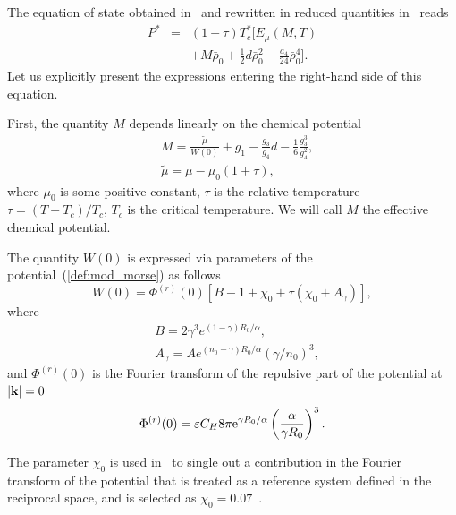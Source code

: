 The equation of state obtained in~\cite{KD20} and rewritten in reduced quantities in~\cite{DKRP24,DKRP24arxiv} reads
\begin{eqnarray}\label{eq:eosMT}
	P^* & = & (1 + \tau)T^*_c \bigg[ E_\mu(M, T) 
	\nonumber\\
	&& + M \bar \rho_0 + \frac{1}{2} d \bar \rho_0^2 - \frac{a_4}{24} \bar \rho_0^4
	\bigg].
\end{eqnarray}
Let us explicitly present the expressions entering the right-hand side of this equation.

First, the quantity $M$ depends linearly on the chemical potential
\begin{align}\label{chem_pot}
	&	M = \frac{\tilde\mu}{W(0)} + g_1 - \frac{g_3}{g_4} d - \frac{1}{6} \frac{g_3^3}{g_4^2}, \\
	&	\tilde\mu=\mu-\mu_0(1+\tau),
\end{align}
where $\mu_0$ is some positive constant, $\tau$ is the relative temperature $\tau = (T - T_c) / T_c$, $T_c$ is the critical temperature. We will call $M$ the effective chemical potential.

The quantity $W(0)$ is expressed via parameters of the potential~(\ref{def:mod_morse}) as follows
\begin{equation}
	W(0) = \Phi^{(r)}(0) \left[ B - 1 + \chi_0 + \tau (\chi_0 + A_\gamma) \right],
\end{equation}
where
\begin{align*} 
	& B = 2 \gamma^3 e^{(1-\gamma)R_0/\alpha},
	\nonumber \\
	& A_\gamma = A e^{(n_0-\gamma)R_0/\alpha} \left( \gamma / n_0\right)^3, 
\end{align*}
and $\Phi^{(r)}(0)$ is the Fourier transform of the repulsive part of the potential at $\abs{\vb k}=0$
\begin{equation*}
	\Phi^{(r)}(0) = \varepsilon C_H 8\pi {\rm e}^{\gamma R_0/\alpha} \left(\frac{\alpha}{\gamma R_0}\right)^3.
\end{equation*}

The parameter $\chi_0$ is used in~\cite{KD20} to single out a contribution in the Fourier transform of the potential that is treated as a reference system defined in the reciprocal space, and is selected as $\chi_0 = 0.07$~\cite{KD20}.

